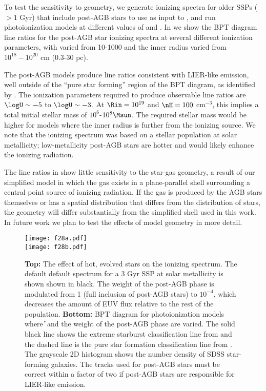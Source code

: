 To test the sensitivity to geometry, we generate ionizing spectra for older SSPs ($>1$ Gyr) that include post-AGB stars to use as input to \Cloudy, and run photoionization models at different values of \Rin{} and \nH{}. In  we show the BPT diagram line ratios for the post-AGB star ionizing spectra at several different ionization parameters, with \nH varied from 10-1000 and the inner radius varied from $10^{18}-10^{20}$ cm (0.3-30 pc). 

The post-AGB models produce line ratios consistent with LIER-like emission, well outside of the ``pure star forming'' region of the BPT diagram, as identified by \citet{Kauffmann03a}. The ionization parameters required to produce observable line ratios are $\logU \sim -5$ to  $\logU \sim -3$. At $\Rin=10^{19}$ and $\nH=100$ cm$^{-3}$, this implies a total initial stellar mass of $10^6$-$10^8\Msun$. The required stellar mass would be higher for models where the inner radius is further from the ionizing source. We note that the ionizing spectrum was based on a stellar population at solar metallicity; low-metallicity post-AGB stars are hotter and would likely enhance the ionizing radiation.

The line ratios in  show little sensitivity to the star-gas geometry, a result of our simplified model in which the gas exists in a plane-parallel shell surrounding a central point source of ionizing radiation. If the gas is produced by the AGB stars themselves or has a spatial distribution that differs from the distribution of stars, the geometry will differ substantially from the simplified shell used in this work. In future work we plan to test the effects of model geometry in more detail. 

\begin{figure}[!htbp]
  \begin{centering}
    \texttt{[image: f28a.pdf]}\\
    \texttt{[image: f28b.pdf]}
    \caption{\textbf{Top:} The effect of hot, evolved stars on the ionizing spectrum. The default default spectrum for a 3 Gyr SSP at solar metallicity is shown shown in black. The weight of the post-AGB phase is modulated from 1 (full inclusion of post-AGB stars) to $10^{-4}$, which decreases the amount of EUV flux relative to the rest of the population. \textbf{Bottom:} BPT diagram for photoionization models where \U{} and the weight of the post-AGB phase are varied. The solid black line shows the extreme starburst classification line from \citet{Kewley01} and the dashed line is the pure star formation classification line from \citet{Kauffmann03a}. The grayscale 2D histogram shows the number density of SDSS star-forming galaxies. The \citet{Vassiliadis} tracks used for post-AGB stars must be correct within a factor of two if post-AGB stars are responsible for LIER-like emission.}
    \label{fig:hotstars}
  \end{centering}
\end{figure}

